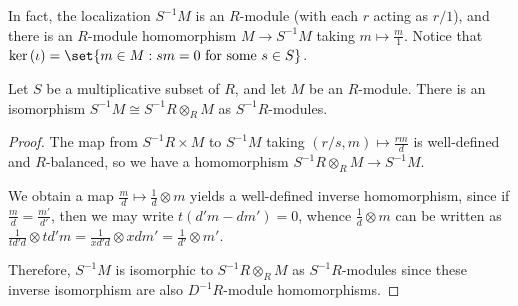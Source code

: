 \documentclass[10pt]{mypackage}
\begin{document}
In fact, the localization $S^{-1}M$ is an $R$-module (with each $r$ acting as $r/1$), and there is an $R$-module homomorphism $M\rightarrow S^{-1}M$ taking $m\mapsto \frac{m}{1}$. Notice that $\ker\left( \iota \right) = \set{m\in M : sm = 0\text{ for some }s\in S}$.
\begin{proposition}
  Let $S$ be a multiplicative subset of $R$, and let $M$ be an $R$-module. There is an isomorphism $S^{-1}M\cong S^{-1}R\otimes_{R}M$ as $S^{-1}R$-modules.
\end{proposition}
\begin{proof}
  The map from $S^{-1}R\times M$ to $S^{-1}M$ taking $\left( r/s,m \right)\mapsto \frac{rm}{d}$ is well-defined and $R$-balanced, so we have a homomorphism $S^{-1}R\otimes_{R}M\rightarrow S^{-1}M$.

  We obtain a map $\frac{m}{d}\mapsto \frac{1}{d}\otimes m$ yields a well-defined inverse homomorphism, since if $\frac{m}{d} = \frac{m'}{d'}$, then we may write $t\left( d'm-dm' \right) = 0$, whence $\frac{1}{d}\otimes m$ can be written as $\frac{1}{td'd}\otimes td'm = \frac{1}{xd'd}\otimes xdm' = \frac{1}{d'}\otimes m'$.

  Therefore, $S^{-1}M$ is isomorphic to $S^{-1}R\otimes_{R}M$ as $S^{-1}R$-modules since these inverse isomorphism are also $D^{-1}R$-module homomorphisms.
\end{proof}
\end{document}
